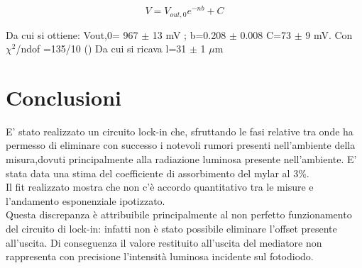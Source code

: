 \begin{equation}
V=V_{out,0}e^{-nb} + C
\end{equation}

Da cui si ottiene:
V{out,0}= 967 $\pm$ 13 mV ;  b=0.208 $\pm$ 0.008  C=73 $\pm$ 9 mV. Con $\chi^{2}$/ndof =135/10 ()
Da cui si ricava l=31 $\pm$  1 $\mu$m
\section{Conclusioni}
E' stato realizzato un circuito lock-in che, sfruttando le fasi relative tra onde ha permesso di eliminare con successo i notevoli rumori presenti nell'ambiente della misura,dovuti principalmente alla radiazione luminosa presente nell'ambiente. E' stata data una stima del coefficiente di assorbimento del mylar al 3\%. \\
Il fit realizzato mostra che non c'è accordo quantitativo tra le misure e l'andamento esponenziale ipotizzato.\\
Questa discrepanza è attribuibile principalmente al non perfetto funzionamento del circuito di lock-in: infatti non è stato possibile  eliminare l'offset presente all'uscita. Di conseguenza il valore restituito all'uscita del mediatore non rappresenta con precisione l'intensità luminosa incidente sul fotodiodo.\\
